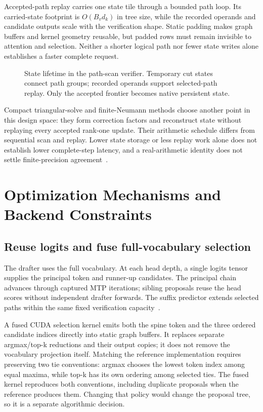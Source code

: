\documentclass[conference]{IEEEtran}
\begin{document}
Accepted-path replay carries one state tile through a bounded path loop. Its carried-state footprint is $O(B_vd_k)$ in tree size, while the recorded operands and candidate outputs scale with the verification shape. Static padding makes graph buffers and kernel geometry reusable, but padded rows must remain invisible to attention and selection. Neither a shorter logical path nor fewer state writes alone establishes a faster complete request.

\begin{figure}[t]
\centering

\caption{State lifetime in the path-scan verifier. Temporary cut states connect path groups; recorded operands support selected-path replay. Only the accepted frontier becomes native persistent state.}
\label{fig:scan-replay}
\end{figure}

Compact triangular-solve and finite-Neumann methods choose another point in this design space: they form correction factors and reconstruct state without replaying every accepted rank-one update. Their arithmetic schedule differs from sequential scan and replay. Lower state storage or less replay work alone does not establish lower complete-step latency, and a real-arithmetic identity does not settle finite-precision agreement~\cite{ghantasala2026treewy,wang2026bole}.

\section{Optimization Mechanisms and Backend Constraints}
\label{sec:optimization}
\subsection{Reuse logits and fuse full-vocabulary selection}
The drafter uses the full vocabulary. At each head depth, a single logits tensor supplies the principal token and runner-up candidates. The principal chain advances through captured MTP iterations; sibling proposals reuse the head scores without independent drafter forwards. The suffix predictor extends selected paths within the same fixed verification capacity~\cite{lumo2026archive}.

A fused CUDA selection kernel emits both the spine token and the three ordered candidate indices directly into static graph buffers. It replaces separate argmax/top-k reductions and their output copies; it does not remove the vocabulary projection itself. Matching the reference implementation requires preserving two tie conventions: argmax chooses the lowest token index among equal maxima, while top-k has its own ordering among selected ties. The fused kernel reproduces both conventions, including duplicate proposals when the reference produces them. Changing that policy would change the proposal tree, so it is a separate algorithmic decision.
\end{document}
